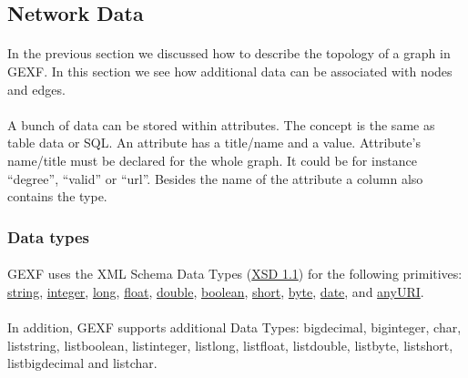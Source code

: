 \documentclass[a4paper,10pt]{article}
\begin{document}
\subsection{Network Data} \label{networkdata}

\paragraph{}
In the previous section we discussed how to describe the topology of a graph in GEXF. In this section we see how additional data can be associated with nodes and edges.

\paragraph{}
A bunch of data can be stored within attributes. The concept is the same as table data or SQL. An attribute has a title/name and a value. Attribute’s name/title must be declared for the whole graph. It could be for instance “degree”, “valid” or “url”. Besides the name of the attribute a column also contains the type.

\subsubsection{Data types}

\paragraph{}
GEXF uses the XML Schema Data Types (\href{http://www.w3.org/TR/xmlschema-2/}{XSD 1.1}) for the following primitives: \href{http://www.w3.org/TR/xmlschema-2/#string}{string}, \href{http://www.w3.org/TR/xmlschema-2/#integer}{integer}, \href{http://www.w3.org/TR/xmlschema-2/#long}{long}, \href{http://www.w3.org/TR/xmlschema-2/#float}{float}, \href{http://www.w3.org/TR/xmlschema-2/#double}{double}, \href{http://www.w3.org/TR/xmlschema-2/#boolean}{boolean}, \href{http://www.w3.org/TR/xmlschema-2/#short}{short}, \href{http://www.w3.org/TR/xmlschema-2/#byte}{byte}, \href{http://www.w3.org/TR/xmlschema-2/#date}{date}, and \href{http://www.w3.org/TR/xmlschema-2/#anyURI}{anyURI}.

\paragraph{}
In addition, GEXF supports additional Data Types: bigdecimal, biginteger, char, liststring, listboolean, listinteger, listlong, listfloat, listdouble, listbyte, listshort, listbigdecimal and listchar.
\end{document}
